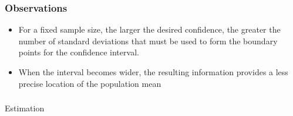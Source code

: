 \begin{frame}[fragile]\frametitle{Observations}
\begin{itemize}
\item For a fixed sample size, the larger the desired confidence, the greater the number of standard deviations that must be used to form the boundary points for the confidence interval.

\item When the interval becomes wider, the resulting information provides a less precise location of the population mean

\end{itemize}

\end{frame}



%

\begin{frame}[fragile]\frametitle{}

\begin{center}
{\large Estimation}
\end{center}
\end{frame}


